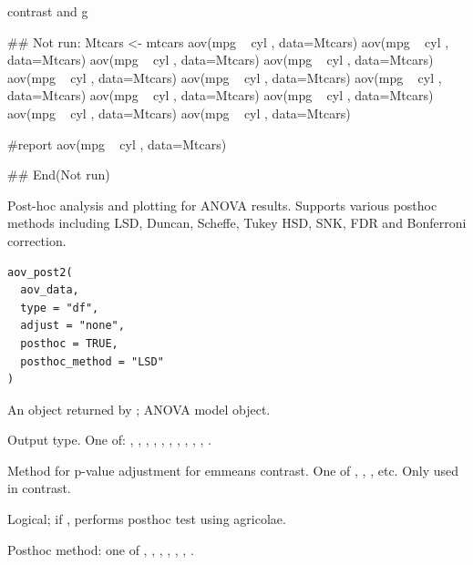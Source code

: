 \documentclass[a4paper]{book}
\begin{document}
%
\begin{Value}
contrast and g
\end{Value}
%
\begin{Examples}
\begin{ExampleCode}

## Not run: 
Mtcars <- mtcars%
aov(mpg ~ cyl , data=Mtcars)%
aov(mpg ~ cyl , data=Mtcars)%
aov(mpg ~ cyl , data=Mtcars)%
aov(mpg ~ cyl , data=Mtcars)%
aov(mpg ~ cyl , data=Mtcars)%
aov(mpg ~ cyl , data=Mtcars)%
aov(mpg ~ cyl , data=Mtcars)%
aov(mpg ~ cyl , data=Mtcars)%
aov(mpg ~ cyl , data=Mtcars)%
aov(mpg ~ cyl , data=Mtcars)%
aov(mpg ~ cyl , data=Mtcars)%

#report
aov(mpg ~ cyl , data=Mtcars)%

## End(Not run)


\end{ExampleCode}
\end{Examples}
%
\begin{Description}
Post-hoc analysis and plotting for ANOVA results. Supports various posthoc methods
including LSD, Duncan, Scheffe, Tukey HSD, SNK, FDR and Bonferroni correction.
\end{Description}
%
\begin{Usage}
\begin{verbatim}
aov_post2(
  aov_data,
  type = "df",
  adjust = "none",
  posthoc = TRUE,
  posthoc_method = "LSD"
)
\end{verbatim}
\end{Usage}
%
\begin{Arguments}
\begin{ldescription}
\item[\code{aov\_data}] An object returned by ; ANOVA model object.

\item[\code{type}] Output type. One of: , , ,
, , , , , ,
, .

\item[\code{adjust}] Method for p-value adjustment for emmeans contrast. One of ,
, , etc. Only used in contrast.

\item[\code{posthoc}] Logical; if , performs posthoc test using agricolae.

\item[\code{posthoc\_method}] Posthoc method: one of , ,
, , , , .
\end{ldescription}
\end{Arguments}
\end{document}
